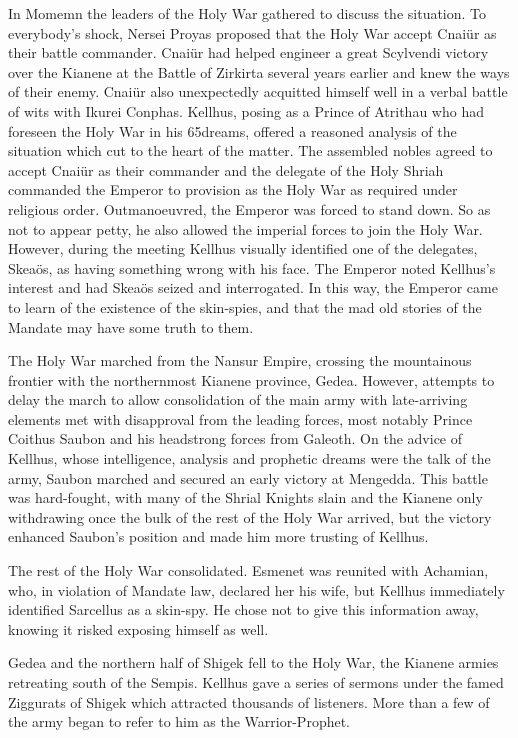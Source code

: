 \documentclass[]{book}
\begin{document}
In Momemn the leaders of the Holy War gathered to discuss the situation. To
everybody's shock, Nersei Proyas proposed that the Holy War accept Cnaiür as their
battle commander. Cnaiür had helped engineer a great Scylvendi victory over the
Kianene at the Battle of Zirkirta several years earlier and knew the ways of their enemy.
Cnaiür also unexpectedly acquitted himself well in a verbal battle of wits with Ikurei
Conphas. Kellhus, posing as a Prince of Atrithau who had foreseen the Holy War in his
65dreams, offered a reasoned analysis of the situation which cut to the heart of the
matter. The assembled nobles agreed to accept Cnaiür as their commander and the
delegate of the Holy Shriah commanded the Emperor to provision as the Holy War as
required under religious order. Outmanoeuvred, the Emperor was forced to stand
down. So as not to appear petty, he also allowed the imperial forces to join the Holy
War. However, during the meeting Kellhus visually identified one of the delegates,
Skeaös, as having something wrong with his face. The Emperor noted Kellhus's interest
and had Skeaös seized and interrogated. In this way, the Emperor came to learn of the
existence of the skin-spies, and that the mad old stories of the Mandate may have some
truth to them.

The Holy War marched from the Nansur Empire, crossing the mountainous frontier
with the northernmost Kianene province, Gedea. However, attempts to delay the
march to allow consolidation of the main army with late-arriving elements met with
disapproval from the leading forces, most notably Prince Coithus Saubon and his
headstrong forces from Galeoth. On the advice of Kellhus, whose intelligence, analysis
and prophetic dreams were the talk of the army, Saubon marched and secured an early
victory at Mengedda. This battle was hard-fought, with many of the Shrial Knights slain
and the Kianene only withdrawing once the bulk of the rest of the Holy War arrived,
but the victory enhanced Saubon's position and made him more trusting of Kellhus.

The rest of the Holy War consolidated. Esmenet was reunited with Achamian, who, in
violation of Mandate law, declared her his wife, but Kellhus immediately identified
Sarcellus as a skin-spy. He chose not to give this information away, knowing it risked
exposing himself as well.

Gedea and the northern half of Shigek fell to the Holy War, the Kianene armies
retreating south of the Sempis. Kellhus gave a series of sermons under the famed
Ziggurats of Shigek which attracted thousands of listeners. More than a few of the army
began to refer to him as the Warrior-Prophet.
\end{document}
